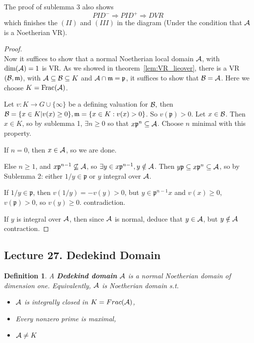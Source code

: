 \documentclass[11pt]{article}
\newtheorem{dfn}[thm]{Definition}
\newcommand{\scm}{{\mathfrak m}}
\newcommand{\scp}{{\mathfrak p}}
\newcommand{\cala}{{\cal A}}
\newcommand{\calb}{{\cal B}}
\newcommand{\Lrta}{\Longrightarrow}
\newcommand{\lrta}{\longrightarrow}
\begin{document}
The proof of sublemma 3 also shows
$$
PID^-\Lrta PID^+\Lrta DVR
$$
which finishes the $(II)$ and $(III)$ in the diagram (Under the condition that $\cala$ is a Noetherian VR).
\begin{proof}\ \\
Now it suffices to show that a normal Noetherian local domain $\cala$, with $\text{dim}(\cala)=1$ is VR.
As we showed in theorem~\ref{lem:VR_lieover}, there is a VR $(\calb,\scm)$, with $\cala\subseteq \calb\subseteq K$ and $\cala\cap \scm=\scp$, it suffices to show that $\calb=\cala$. Here we choose $K=\text{Frac}(\cala)$. 

Let $v:K\lrta G\cup \{\infty\}$ be a defining valuation for $\calb,$ then $\calb=\{x\in K|v(x)\geq 0\},\scm=\{x\in K: v(x)>0\}$. So $v(\scp)>0$. Let $x\in \calb$. Then $x\in K$, so by sublemma 1, $\exists n\geq 0$ so that $x\scp^n\subseteq \cala$. Choose $n$ minimal with this property.

If $n=0$, then $x\in \cala$, so we are done. 

Else $n\geq 1$, and $x\scp^{n-1}\not\subseteq\cala$, so $\exists y\in x\scp^{n-1},y\notin \cala$. Then $y\scp \subseteq x\scp^n\subseteq \cala$,  so by Sublemma 2: either $1/y\in\scp$ or $y$ integral over $\cala$.

If $1/y\in\scp$, then $v(1/y)=-v(y)>0$, but $y\in\scp^{n-1}x$ and $v(x)\geq 0$, $v(\scp)>0$, so $v(y)\geq 0$. contradiction.

If $y$ is integral over $\cala$, then since $\cala$ is normal, deduce that $y\in\cala$, but $y\notin \cala$ contraction.
\end{proof}

\subsection{Lecture 27. Dedekind Domain}
\begin{dfn}
A \textbf{Dedekind domain} $\cala$ is a normal Noetherian domain of dimension one. Equivalently, $\cala$ is Noetherian domain s.t.
\begin{itemize}
    \item $\cala$ is integrally closed in $K=Frac(\cala)$,
    \item Every nonzero prime is maximal,
    \item $\cala\neq K$
\end{itemize}
\end{dfn}
\end{document}
